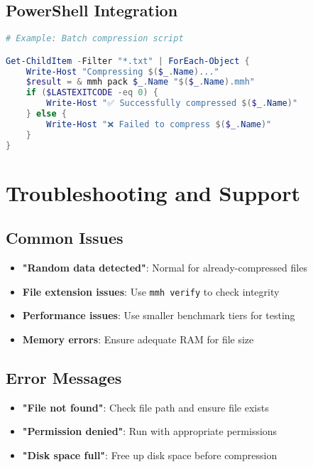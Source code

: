 \documentclass[12pt,a4paper]{article}
\begin{document}
\subsection{PowerShell Integration}
\begin{lstlisting}[language=PowerShell, caption=PowerShell Batch Script]
# Example: Batch compression script

Get-ChildItem -Filter "*.txt" | ForEach-Object {
    Write-Host "Compressing $($_.Name)..."
    $result = & mmh pack $_.Name "$($_.Name).mmh"
    if ($LASTEXITCODE -eq 0) {
        Write-Host "✅ Successfully compressed $($_.Name)"
    } else {
        Write-Host "❌ Failed to compress $($_.Name)"
    }
}
\end{lstlisting}

\newpage

\section{Troubleshooting and Support}

\subsection{Common Issues}
\begin{itemize}
    \item \textbf{"Random data detected"}: Normal for already-compressed files
    \item \textbf{File extension issues}: Use \texttt{mmh verify} to check integrity
    \item \textbf{Performance issues}: Use smaller benchmark tiers for testing
    \item \textbf{Memory errors}: Ensure adequate RAM for file size
\end{itemize}

\subsection{Error Messages}
\begin{itemize}
    \item \textbf{"File not found"}: Check file path and ensure file exists
    \item \textbf{"Permission denied"}: Run with appropriate permissions
    \item \textbf{"Disk space full"}: Free up disk space before compression
\end{itemize}
\end{document}
